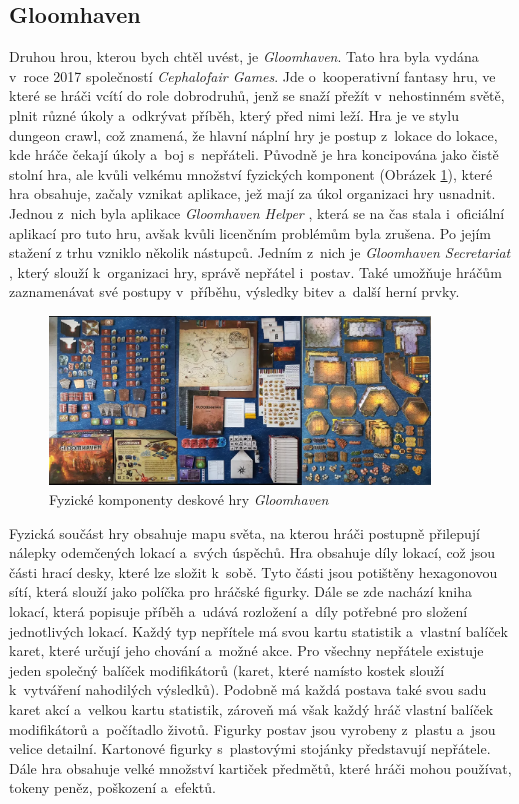 \subsection{Gloomhaven}
Druhou hrou, kterou bych chtěl uvést, je \textit{Gloomhaven}. Tato hra byla vydána v~roce 2017 společností \textit{Cephalofair Games}. Jde o~kooperativní fantasy hru, ve které se hráči vcítí do role dobrodruhů, jenž se snaží přežít v~nehostinném světě, plnit různé úkoly a~odkrývat příběh, který před nimi leží. Hra je ve stylu dungeon crawl, což znamená, že hlavní náplní hry je postup z~lokace do lokace, kde hráče čekají úkoly a~boj s~nepřáteli. Původně je hra koncipována jako čistě stolní hra, ale kvůli velkému množství fyzických komponent (Obrázek \ref{fig:gloomhaven_contents}), které hra obsahuje, začaly vznikat aplikace, jež mají za úkol organizaci hry usnadnit. Jednou z~nich byla aplikace \textit{Gloomhaven Helper} \cite{gloomhaven_helper}, která se na čas stala i~oficiální aplikací pro tuto hru, avšak kvůli licenčním problémům byla zrušena. Po jejím stažení z trhu vzniklo několik nástupců. Jedním z~nich je \textit{Gloomhaven Secretariat} \cite{gloomhaven_secretariat}, který slouží k~organizaci hry, správě nepřátel i~postav. Také umožňuje hráčům zaznamenávat své postupy v~příběhu, výsledky bitev a~další herní prvky.

\begin{figure}[H]
    \centering
    \includegraphics[width=0.9\textwidth]{resources/figures/gloomhaven.png}
    \caption{Fyzické komponenty deskové hry \textit{Gloomhaven} \cite{gloomhaven}}
    \label{fig:gloomhaven_contents}
\end{figure}

Fyzická součást hry obsahuje mapu světa, na kterou hráči postupně přilepují nálepky odemčených lokací a~svých úspěchů. Hra obsahuje díly lokací, což jsou části hrací desky, které lze složit k~sobě. Tyto části jsou potištěny hexagonovou sítí, která slouží jako políčka pro hráčské figurky. Dále se zde nachází kniha lokací, která popisuje příběh a~udává rozložení a~díly potřebné pro složení jednotlivých lokací. Každý typ nepřítele má svou kartu statistik a~vlastní balíček karet, které určují jeho chování a~možné akce. Pro všechny nepřátele existuje jeden společný balíček modifikátorů (karet, které namísto kostek slouží k~vytváření nahodilých výsledků). Podobně má každá postava také svou sadu karet akcí a~velkou kartu statistik, zároveň má však každý hráč vlastní balíček modifikátorů a~počítadlo životů. Figurky postav jsou vyrobeny z~plastu a~jsou velice detailní. Kartonové figurky s~plastovými stojánky představují nepřátele. Dále hra obsahuje velké množství kartiček předmětů, které hráči mohou používat, tokeny peněz, poškození a~efektů.